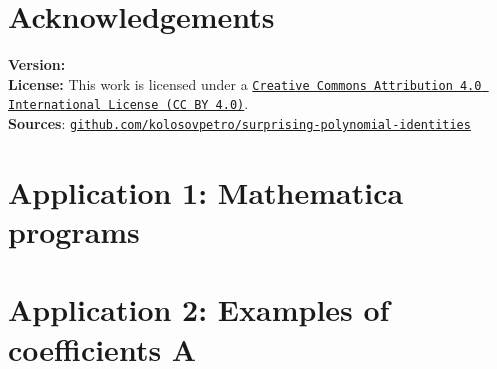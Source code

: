\documentclass[12pt,letterpaper,oneside,reqno]{amsart}
\begin{document}
    \section*{Acknowledgements}
    

    
    

    \noindent \textbf{Version:} 
    \\[1em]
    \noindent \textbf{License:} This work is licensed under a
    \href{https://creativecommons.org/licenses/by/4.0/}
    {\texttt{Creative Commons Attribution 4.0 International License (CC BY 4.0)}}.
    \\[1em]
    \noindent \textbf{Sources}:
    \href{https://github.com/kolosovpetro/unexpected-polynomial-identities-classical-interpolation}
    {\texttt{github.com/kolosovpetro/surprising-polynomial-identities}}

    \clearpage


    \section*{Application 1: Mathematica programs}
    

    \clearpage


    \section*{Application 2: Examples of coefficients A}
    


%    
\end{document}
